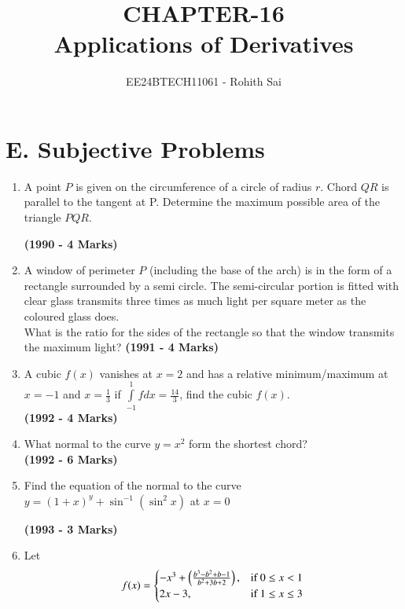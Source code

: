 \documentclass[journal,12pt,twocolumn]{IEEEtran}
\theoremstyle{remark}
\begin{document}

\vspace{3cm}

\title{CHAPTER-16\\Applications of Derivatives}
\author{EE24BTECH11061 - Rohith Sai}
\maketitle
\newpage
\bigskip

\renewcommand{\thefigure}{\theenumi}
\renewcommand{\thetable}{\theenumi}

\section{\textbf{E. Subjective Problems}}

\begin{enumerate}

\item A point $P$ is given on the circumference of a circle of radius $r$. Chord $QR$ is parallel to the tangent at P. Determine the maximum possible area of the triangle $PQR.$

\hfill{\textbf{(1990 - 4 Marks)}}


\item A window of perimeter $P$ (including the base of the arch) is in the form of a rectangle surrounded by a semi circle. The semi-circular portion is fitted with clear glass transmits three times as much light per square meter as the coloured glass does.\\What is the ratio for the sides of the rectangle so that the window transmits the maximum light?
\hfill{\textbf{(1991 - 4 Marks)}}

\item A cubic $f(x)$ vanishes at $x=2$ and has a relative minimum/maximum at $x=-1$ and $x=\frac{1}{3}$ if $\int\limits_{-1}^1 f dx = \frac{14}{3}$, find the cubic $f(x)$.\\
\hfill{\textbf{(1992 - 4 Marks)}}

\item What normal to the curve $y=x^2$ form the shortest chord?\\
\hfill{\textbf{(1992 - 6 Marks)}}

\item Find the equation of the normal to the curve $y=(1+x)^y + \sin^{-1}(\sin^2x)$ at $x=0$

\hfill{\textbf{(1993 - 3 Marks)}}


\item Let 
\[ f(x) = \begin{cases}
-x^3 + \left(\frac{b^3-b^2+b-1}{b^2+3b+2}\right), & \text{if } 0\leq x < 1\\
2x-3, & \text{if } 1\leq x \leq 3
\end{cases}
\]


\end{enumerate}
\end{document}
